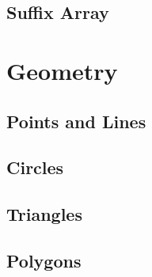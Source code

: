 \documentclass[a4paper,landscape,8pt]{article}
\begin{document}
\begin{multicols}{2}
\subsection{Suffix Array}



\section{Geometry}

\subsection{Points and Lines}


\subsection{Circles}


\subsection{Triangles}


\subsection{Polygons}



\end{multicols}
\end{document}
